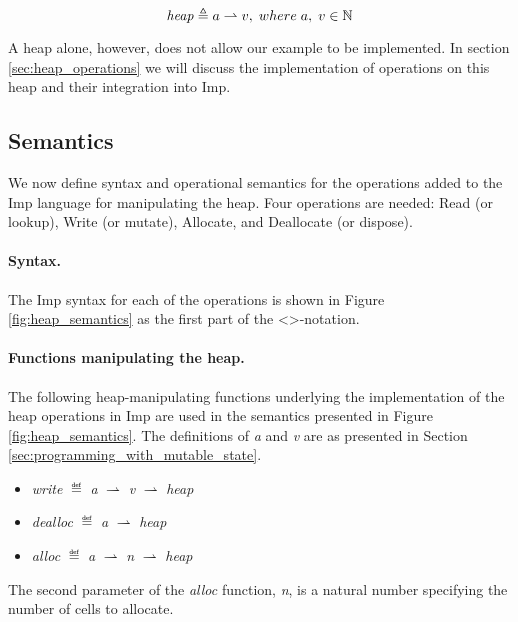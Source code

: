 \[
\mathit{heap} \mathrel{\triangleq} a\rightharpoonup v, \; where\; a, \;v \in \mathbb{N}
\] 

A heap alone, however, does not allow our example to be implemented. In section \ref{sec:heap_operations} we will discuss the implementation of operations on this heap and their integration into Imp.

\subsection{Semantics}
We now define syntax and operational semantics for the operations added to the Imp language for manipulating the heap. Four operations are needed: Read (or lookup), Write (or mutate), Allocate, and Deallocate (or dispose).
\paragraph{Syntax.}
The Imp syntax for each of the operations is shown in Figure \ref{fig:heap_semantics} as the first part of the \textless \textgreater -notation.
\paragraph{Functions manipulating the heap.}
The following heap-manipulating functions underlying the implementation of the heap operations in Imp are used in the semantics presented in Figure \ref{fig:heap_semantics}. The definitions of {\it a} and {\it v} are as presented in Section \ref{sec:programming_with_mutable_state}.
\begin{itemize}
\item {\it write} $\eqdef$ {\it a} $\rightharpoonup$ {\it v} $\rightharpoonup$ {\it heap}
\item {\it dealloc} $\eqdef$ {\it a} $\rightharpoonup$ {\it heap}
\item {\it alloc} $\eqdef$ {\it a} $\rightharpoonup$ {\it n} $\rightharpoonup$ {\it heap}
\end{itemize}
The second parameter of the {\it alloc} function, {\it n}, is a natural number specifying the number of cells to allocate.

